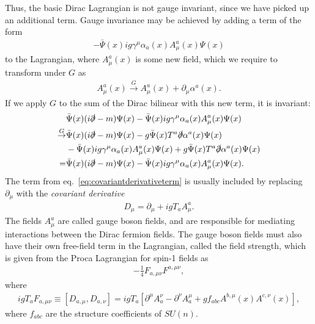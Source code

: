 Thus, the basic Dirac Lagrangian is not gauge invariant, since we have picked up an additional term. Gauge invariance may be achieved by adding a term of the form 
\begin{align}
	-\bar\Psi(x) ig\gamma^\mu \alpha_a(x)A^a_\mu(x) \Psi(x)\label{eq:covariantderivativeterm}
\end{align}
to the Lagrangian, where $A^a_\mu(x)$ is some new field, which we require to transform under $G$ as
\begin{align}
	A^a_\mu(x) \overset{G}{\to} A^a_\mu(x) + \partial_\mu \alpha^a(x).
\end{align}
If we apply $G$ to the sum of the Dirac bilinear with this new term, it is invariant:
\begin{align}
	&\bar\Psi(x)(i\slashed\partial - m)\Psi(x) - \bar\Psi(x) ig\gamma^\mu \alpha_a(x)A^a_\mu(x) \Psi(x)\nonumber\\
	\overset{G}{\to} &\bar\Psi(x)(i\slashed\partial - m)\Psi(x) - g\bar\Psi(x) T^a\slashed\partial \alpha^a(x) \Psi(x)\\
	 &- \bar\Psi(x) ig\gamma^\mu \alpha_a(x)A^a_\mu(x) \Psi(x) +  g\bar\Psi(x) T^a\slashed\partial \alpha^a(x) \Psi(x)\nonumber\\
	 = &\bar\Psi(x)(i\slashed\partial - m)\Psi(x) - \bar\Psi(x) ig\gamma^\mu \alpha_a(x)A^a_\mu(x) \Psi(x).\nonumber
\end{align}
The term from eq.\ \eqref{eq:covariantderivativeterm} is usually included by replacing $\partial_\mu$ with the {\it covariant derivative}
\begin{align}
	D_\mu = \partial_\mu + igT_a A^a_\mu.
\end{align}
The fields $A^a_\mu$ are called gauge boson fields, and are responsible for mediating interactions between the Dirac fermion fields. The gauge boson fields must also have their own free-field term in the Lagrangian, called the field strength, which is given from the Proca Lagrangian for spin-1 fields as 
\begin{align}
	-\frac{1}{4} F_{a,\mu\nu} F^{a,\mu\nu},
\end{align}
where
\begin{align}
	igT_a F_{a,\mu\nu} \equiv [D_{a,\mu}, D_{a,\nu}] = igT_a \left[ \partial^\mu A_a^\nu - \partial^\nu A_a^\mu + g f_{abc} A^{b,\mu}(x)A^{c,\nu}(x) \right],
\end{align}
where $f_{abc}$ are the structure coefficients of $SU(n)$.

